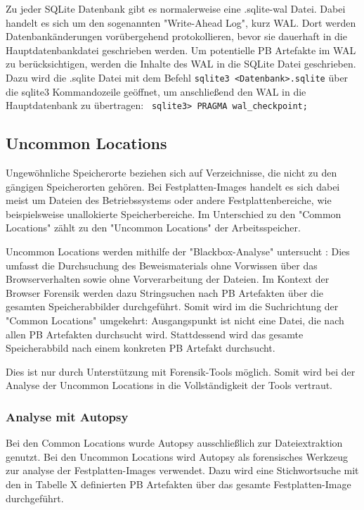 Zu jeder SQLite Datenbank gibt es normalerweise eine .sqlite-wal Datei. Dabei handelt es sich um den sogenannten "Write-Ahead Log", kurz WAL. Dort werden Datenbankänderungen vorübergehend protokollieren, bevor sie dauerhaft in die Hauptdatenbankdatei geschrieben werden. 
Um potentielle PB Artefakte im WAL zu berücksichtigen, werden die Inhalte des WAL in die SQLite Datei geschrieben. Dazu wird die .sqlite Datei mit dem Befehl \texttt{sqlite3 <Datenbank>.sqlite} über die sqlite3 Kommandozeile geöffnet, um anschließend den WAL in die Hauptdatenbank zu übertragen: \texttt{ sqlite3> PRAGMA wal\_checkpoint;}

\subsection{Uncommon Locations}

Ungewöhnliche Speicherorte beziehen sich auf Verzeichnisse, die nicht zu den gängigen Speicherorten gehören. 
Bei Festplatten-Images handelt es sich dabei meist um Dateien des Betriebssystems oder andere Festplattenbereiche, wie beispielsweise unallokierte Speicherbereiche.
Im Unterschied zu den "Common Locations" zählt zu den "Uncommon Locations" der Arbeitsspeicher.

Uncommon Locations werden mithilfe der "Blackbox-Analyse" untersucht \cite{Bonetti.2014}:
Dies umfasst die Durchsuchung des Beweismaterials ohne Vorwissen über das Browserverhalten sowie ohne Vorverarbeitung der Dateien.
Im Kontext der Browser Forensik werden dazu Stringsuchen nach PB Artefakten über die gesamten Speicherabbilder durchgeführt.
Somit wird im die Suchrichtung der "Common Locations" umgekehrt: 
Ausgangspunkt ist nicht eine Datei, die nach allen PB Artefakten durchsucht wird. 
Stattdessend wird das gesamte Speicherabbild nach einem konkreten PB Artefakt durchsucht.

Dies ist nur durch Unterstützung mit Forensik-Tools möglich. Somit wird bei der Analyse der Uncommon Locations in die Vollständigkeit der Tools vertraut.


\subsubsection*{Analyse mit Autopsy}

Bei den Common Locations wurde Autopsy ausschließlich zur Dateiextraktion genutzt. Bei den Uncommon Locations wird Autopsy als forensisches Werkzeug zur analyse der Festplatten-Images verwendet.
Dazu wird eine Stichwortsuche mit den in Tabelle X definierten PB Artefakten über das gesamte Festplatten-Image durchgeführt.

